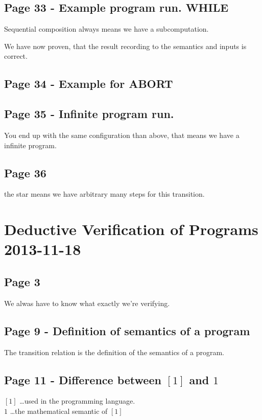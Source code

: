 \documentclass[a4paper]{article}
\begin{document}
\subsection{Page 33 - Example program run. WHILE}

Sequential composition always means we have a subcomputation.

We have now proven, that the result recording to the semantics and inputs is
correct.

\subsection{Page 34 - Example for ABORT}


\subsection{Page 35 - Infinite program run.}

You end up with the same configuration than above, that means we have a infinite
program.

\subsection{Page 36} the star means we have arbitrary many steps for this
transition.



\section{Deductive Verification of Programs 2013-11-18}

\subsection{Page 3}
We alwas have to know what exactly we're verifying.

\subsection{Page 9 - Definition of semantics of a program}
The transition relation is the definition of the semantics of a program.

\subsection{Page 11 - Difference between $[1]$ and $1$}
$[1]$ \ldots used in the programming language.\\
$1$ \ldots the mathematical semantic of $[1]$
\end{document}
